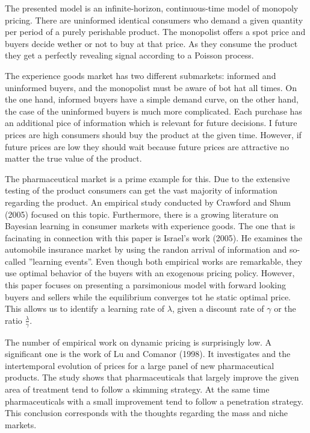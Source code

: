 \documentclass[12pt]{report}
\numberwithin{equation}{section}
\begin{document}
The presented model is an infinite-horizon, continuous-time model of monopoly pricing. There are uninformed identical consumers who demand a given quantity per period of a purely perishable product. The monopolist offers a spot price and buyers decide wether or not to buy at that price. As they consume the product they get a perfectly revealing signal according to a Poisson process.

The experience goods market has two different submarkets: informed and uninformed buyers, and the monopolist must be aware of bot hat all times. On the one hand, informed buyers have a simple demand curve, on the other hand, the case of the uninformed buyers is much more complicated. Each purchase has an additional pice of information which is relevant for future decisions. I future prices are high consumers should buy the product at the given time. However, if future prices are low they should wait because future prices are attractive no matter the true value of the product.

The pharmaceutical market is a prime example for this. Due to the extensive testing of the product consumers can get the vast majority of information regarding the product. An empirical study conducted by Crawford and Shum (2005) focused on this topic. Furthermore, there is a growing literature on Bayesian learning in consumer markets with experience goods. The one that is facinating in connection with this paper is Israel’s work (2005). He examines the automobile insurance market by using the randon arrival of information and so-called ”learning events”. Even though both empirical works are remarkable, they use optimal behavior of the buyers with an exogenous pricing policy. However, this paper focuses on presenting a parsimonious model with forward looking buyers and sellers while the equilibrium converges tot he static optimal price. This allows us to identify a learning rate of $\lambda$, given a discount rate of $\gamma$ or the ratio $\frac{\lambda}{\gamma}$.

The number of empirical work on dynamic pricing is surprisingly low. A significant one is the work of Lu and Comanor (1998). It investigates and the intertemporal evolution of prices for a large panel of new pharmaceutical products. The study shows that pharmaceuticals that largely improve the given area of treatment tend to follow a skimming strategy. At the same time pharmaceuticals with a small improvement tend to follow a penetration strategy. This conclusion corresponds with the thoughts regarding the mass and niche markets. 
\end{document}
